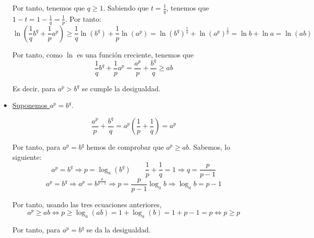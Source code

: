 \begin{ejercicio}
\begin{itemize}
        Por tanto, tenemos que $q\geq 1$. Sabiendo que $t=\frac{1}{q}$, tenemos que $1-t = 1-\frac{1}{q} = \frac{1}{p}$. Por tanto:
        \begin{equation*}
            \ln \left(\frac{1}{q}b^q+\frac{1}{p}a^p\right) \geq \frac{1}{q}\ln (b^q)+\frac{1}{p}\ln (a^p) = \ln (b^q)^{\frac{1}{q}} + \ln (a^p)^{\frac{1}{p}} = \ln b + \ln a = \ln (ab)
        \end{equation*}
    
        Por tanto, como $\ln$ es una función creciente, tenemos que
        \begin{equation*}
            \frac{1}{q}b^q+\frac{1}{p}a^p = \frac{a^p}{p} + \frac{b^q}{q} \geq ab
        \end{equation*}
    
        Es decir, para $a^p > b^q$ se cumple la desigualdad.
        
        \item \underline{Suponemos $a^p=b^q$}.
        
        \begin{equation*}
            \frac{a^p}{p} + \frac{b^q}{q} = a^p\left( \frac{1}{p} + \frac{1}{q}\right) = a^p
        \end{equation*}
        
        Por tanto, para $a^p=b^q$ hemos de comprobar que $a^p \geq ab$. Sabemos, lo siguiente:
        \begin{equation*}
            a^p=b^q \Longrightarrow p = \log_a(b^q)
            \qquad
            \frac{1}{p} + \frac{1}{q} = 1 \Longrightarrow q = \frac{p}{p-1}
        \end{equation*}
        \begin{equation*}
            a^p = b^q \Longrightarrow a^p = b^{\frac{p}{p-1}} \Longrightarrow p = \frac{p}{p-1} \log_a b \Longrightarrow \log_a b = {p-1}
        \end{equation*}
        
        Por tanto, usando las tres ecuaciones anteriores,
        \begin{equation*}
            a^p \geq ab \Longleftrightarrow p \geq \log_a(ab) = 1+\log_a(b) = 1+p-1 = p \Longleftrightarrow p \geq p
        \end{equation*}
    
        Por tanto, para $a^p = b^q$ se da la desigualdad.
    \end{itemize}
\end{ejercicio}

